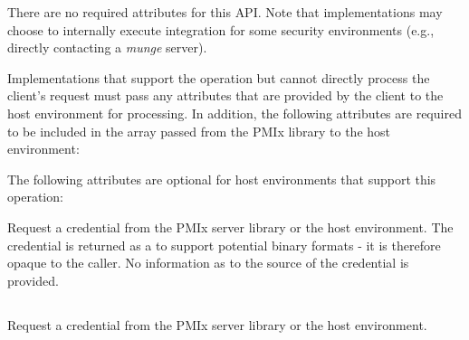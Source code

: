 \reqattrstart
There are no required attributes for this \ac{API}. Note that implementations may choose to internally
execute integration for some security environments (e.g., directly
contacting a \textit{munge} server).

Implementations that support the operation but cannot directly process the client's request must pass any attributes that are provided by the client to the host environment for processing. In addition, the following attributes are required to be included in the  array passed from the \ac{PMIx} library to the host environment:


\reqattrend

\optattrstart
The following attributes are optional for host environments that support this operation:


\optattrend

\descr

Request a credential from the \ac{PMIx} server library or the host environment. The credential is returned as a  to support potential binary formats - it is therefore opaque to the caller. No information as to the source of the credential is provided.


\subsection{}

\summary

Request a credential from the \ac{PMIx} server library or the host environment.

\format


\begin{arglist}
\end{arglist}

